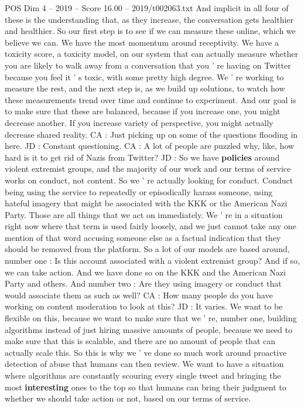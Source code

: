 \begin{textsample}{POS Dim 4 – 2019 – Score 16.00 – 2019/t002063.txt}
And implicit in all four of these is the understanding that, as they increase, the conversation gets healthier and healthier.
So our first step is to see if we can measure these online, which we believe we can.
We have the most momentum around receptivity.
We have a toxicity score, a toxicity model, on our system that can actually measure whether you are likely to walk away from a conversation that you ' re having on Twitter because you feel it ' s toxic, with some pretty high degree.
We ' re working to measure the rest, and the next step is, as we build up solutions, to watch how these measurements trend over time and continue to experiment.
And our goal is to make sure that these are balanced, because if you increase one, you might decrease another.
If you increase variety of perspective, you might actually decrease shared reality.
CA : Just picking up on some of the questions flooding in here.
JD : Constant questioning.
CA : A lot of people are puzzled why, like, how hard is it to get rid of Nazis from Twitter?
JD : So we have \textbf{policies} around violent extremist groups, and the majority of our work and our terms of service works on conduct, not content.
So we ' re actually looking for conduct.
Conduct being using the service to repeatedly or episodically harass someone, using hateful imagery that might be associated with the KKK or the American Nazi Party.
Those are all things that we act on immediately.
We ' re in a situation right now where that term is used fairly loosely, and we just cannot take any one mention of that word accusing someone else as a factual indication that they should be removed from the platform.
So a lot of our models are based around, number one : Is this account associated with a violent extremist group?
And if so, we can take action.
And we have done so on the KKK and the American Nazi Party and others.
And number two : Are they using imagery or conduct that would associate them as such as well?
CA : How many people do you have working on content moderation to look at this?
JD : It varies.
We want to be flexible on this, because we want to make sure that we ' re, number one, building algorithms instead of just hiring massive amounts of people, because we need to make sure that this is scalable, and there are no amount of people that can actually scale this.
So this is why we ' ve done so much work around proactive detection of abuse that humans can then review.
We want to have a situation where algorithms are constantly scouring every single tweet and bringing the most \textbf{interesting} ones to the top so that humans can bring their judgment to whether we should take action or not, based on our terms of service.

\end{textsample}
